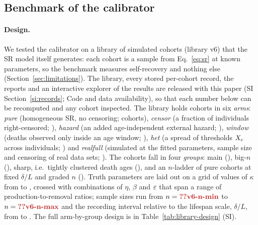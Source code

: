 \subsection{Benchmark of the calibrator}\label{sec:val-benchmark}

\paragraph{Design.} We tested the calibrator on a library of simulated cohorts (library v6) that the SR model itself
generates: each cohort is a sample from Eq.~\eqref{eq:sr} at known parameters, so the benchmark measures
self-recovery and nothing else (Section~\ref{sec:limitations}). The library, every stored per-cohort record, the reports and an interactive explorer of the
results are released with this paper (SI Section~\ref{si:records}; Code and data availability), so that each number
below can be recomputed and any cohort inspected. The library holds  cohorts in six
\emph{arms}: \emph{pure} (homogeneous SR, no censoring;  cohorts), \emph{censor} (a fraction of
individuals right-censored; ), \emph{hazard} (an added age-independent external hazard;
), \emph{window} (deaths observed only inside an age window; ), \emph{het} (a spread
of thresholds $X_c$ across individuals; ) and \emph{realfull} (simulated at the fitted parameters, sample
size and censoring of real data sets; ). The cohorts fall in four \emph{groups}: main
(), big-$n$ (), sharp, i.e.\ tightly clustered death ages (), and an
$n$-ladder of pure cohorts at fixed $\delta/L$ and graded $n$ (). Truth parameters are laid out on a grid of
 values of $\kappa$ from  to , crossed with combinations of $\eta$, $\beta$ and $\varepsilon$ that span a range of production-to-removal ratios; sample sizes run from $n=\C{v6-n-min}$ to $n=\C{v6-n-max}$ and the recording interval relative to
the lifespan scale, $\delta/L$, from  to . The full arm-by-group design is in
Table~\ref{tab:library-design} (SI).


